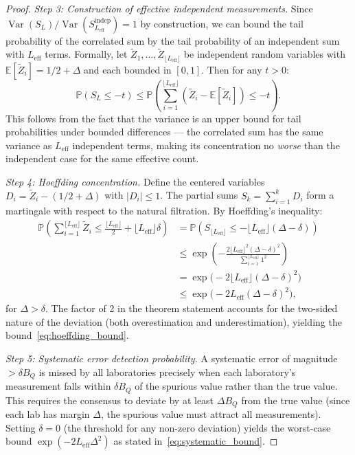 \documentclass[11pt,a4paper]{article}
\newcommand{\eff}{\mathrm{eff}}
\theoremstyle{definition}
\DeclareMathOperator{\Var}{Var}
\newcommand{\E}{\mathbb{E}}
\newcommand{\Pbb}{\mathbb{P}}
\begin{document}
\begin{proof}
\medskip\noindent\textit{Step 3: Construction of effective independent measurements.}
Since $\Var(S_{L}) / \Var(S_{L_{\eff}}^{\text{indep}}) = 1$ by construction,
we can bound the tail probability of the correlated sum by the tail
probability of an independent sum with $L_{\eff}$ terms. Formally,
let $\widetilde{Z}_1, \dots, \widetilde{Z}_{\lfloor L_{\eff}\rfloor}$
be independent random variables with $\E[\widetilde{Z}_i] = 1/2 + \Delta$
and each bounded in $[0,1]$. Then for any $t > 0$:
\begin{equation}
    \Pbb(S_L \leq -t) \leq \Pbb\left(\sum_{i=1}^{\lfloor L_{\eff} \rfloor} (\widetilde{Z}_i - \E[\widetilde{Z}_i]) \leq -t\right).
\end{equation}
This follows from the fact that the variance is an upper bound for tail
probabilities under bounded differences — the correlated sum has the same
variance as $L_{\eff}$ independent terms, making its concentration no
\textit{worse} than the independent case for the same effective count.

\medskip\noindent\textit{Step 4: Hoeffding concentration.}
Define the centered variables $D_i = \widetilde{Z}_i - (1/2 + \Delta)$ with
$|D_i| \leq 1$. The partial sums $S_k = \sum_{i=1}^{k} D_i$ form a martingale
with respect to the natural filtration. By Hoeffding's inequality:
\begin{align}
    \Pbb\left(\sum_{i=1}^{\lfloor L_{\eff}\rfloor} \widetilde{Z}_i \leq \frac{\lfloor L_{\eff}\rfloor}{2} + \lfloor L_{\eff}\rfloor \delta\right)
    &= \Pbb\left(S_{\lfloor L_{\eff}\rfloor} \leq -\lfloor L_{\eff}\rfloor (\Delta - \delta)\right) \\
    &\leq \exp\!\left(-\frac{2 \lfloor L_{\eff}\rfloor^2 (\Delta - \delta)^2}
                           {\sum_{i=1}^{\lfloor L_{\eff}\rfloor} 1^2}\right) \\
    &= \exp\!\bigl(-2 \lfloor L_{\eff}\rfloor (\Delta - \delta)^2\bigr) \\
    &\leq \exp\!\bigl(-2 L_{\eff} (\Delta - \delta)^2\bigr),
\end{align}
for $\Delta > \delta$. The factor of 2 in the theorem statement accounts
for the two-sided nature of the deviation (both overestimation and
underestimation), yielding the bound~\eqref{eq:hoeffding_bound}.

\medskip\noindent\textit{Step 5: Systematic error detection probability.}
A systematic error of magnitude $> \delta B_Q$ is missed by all laboratories
precisely when each laboratory's measurement falls within $\delta B_Q$ of the
spurious value rather than the true value. This requires the consensus
to deviate by at least $\Delta B_Q$ from the true value (since each lab
has margin $\Delta$, the spurious value must attract all measurements).
Setting $\delta = 0$ (the threshold for any non-zero deviation) yields
the worst-case bound $\exp(-2 L_{\eff} \Delta^2)$ as stated in~\eqref{eq:systematic_bound}.
\end{proof}
\end{document}
